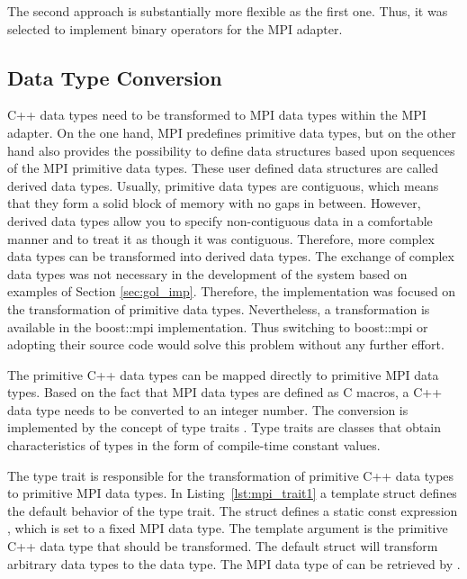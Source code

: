 \noindent The second approach is substantially more flexible as the
first one. Thus, it was selected to implement binary operators for the
MPI adapter.

\subsection{Data Type Conversion}
\label{sec:data_type_conversion}
C++ data types need to be transformed to MPI data types within the MPI
adapter.  On the one hand, MPI predefines primitive data types, but on
the other hand also provides the possibility to define data structures
based upon sequences of the MPI primitive data types. These user
defined data structures are called derived data types. Usually,
primitive data types are contiguous, which means that they form a
solid block of memory with no gaps in between. However, derived data
types allow you to specify non-contiguous data in a comfortable manner
and to treat it as though it was contiguous.  Therefore, more complex
data types can be transformed into derived
data types. The exchange of complex data types was not necessary in
the development of the system based on examples of Section
\ref{sec:gol_imp}. Therefore, the implementation was focused on the
transformation of primitive data types.  Nevertheless, a
transformation is available in the boost::mpi \cite{ref:boost_mpi}
implementation. Thus switching to boost::mpi or adopting their source
code would solve this problem without any further effort.

The primitive C++ data types can be mapped directly to primitive MPI
data types. Based on the fact that MPI data types are defined as C macros,
a C++ data type needs to be converted to an integer number. The
conversion is implemented by the concept of type traits
\cite{ref:type_trait}.  Type traits are classes that obtain
characteristics of types in the form of compile-time constant values.

The type trait is responsible for the transformation of primitive C++
data types to primitive MPI data types.  In
Listing~\ref{lst:mpi_trait1} a template struct defines the default
behavior of the type trait. The struct defines a static const
expression , which is set to a fixed MPI data type. The
template argument  is the primitive C++ data type that
should be transformed. The default struct will transform arbitrary
data types  to the  data type. The MPI data
type of  can be retrieved by
.


